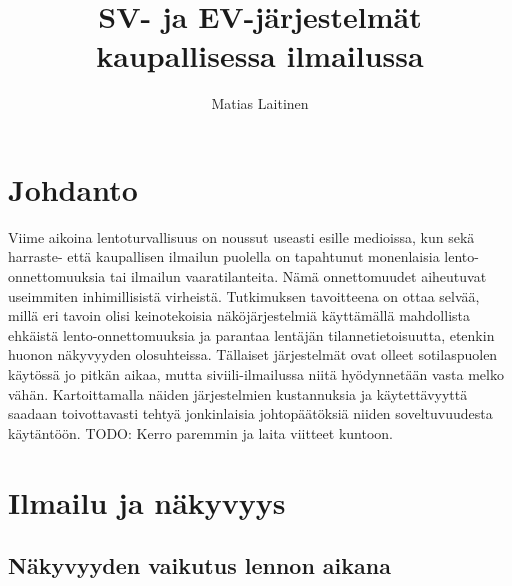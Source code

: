\documentclass[utf8,bachelor,manualbib]{gradu3}
\begin{document}
\title{SV- ja EV-järjestelmät kaupallisessa ilmailussa}



\author{Matias Laitinen}

\maketitle
  
\mainmatter

\chapter{Johdanto}

Viime aikoina lentoturvallisuus on noussut useasti esille medioissa, kun sekä harraste- että kaupallisen ilmailun puolella on tapahtunut monenlaisia lento-onnettomuuksia tai ilmailun vaaratilanteita. Nämä onnettomuudet aiheutuvat useimmiten inhimillisistä virheistä. Tutkimuksen tavoitteena on ottaa selvää, millä eri tavoin olisi keinotekoisia näköjärjestelmiä käyttämällä mahdollista ehkäistä lento-onnettomuuksia ja parantaa lentäjän tilannetietoisuutta, etenkin huonon näkyvyyden olosuhteissa. Tällaiset järjestelmät ovat olleet sotilaspuolen käytössä jo pitkän aikaa, mutta siviili-ilmailussa niitä hyödynnetään vasta melko vähän. Kartoittamalla näiden järjestelmien kustannuksia ja käytettävyyttä saadaan toivottavasti tehtyä jonkinlaisia johtopäätöksiä niiden soveltuvuudesta käytäntöön. TODO: Kerro paremmin ja laita viitteet kuntoon.

\chapter{Ilmailu ja näkyvyys}

\section{Näkyvyyden vaikutus lennon aikana}
\end{document}
